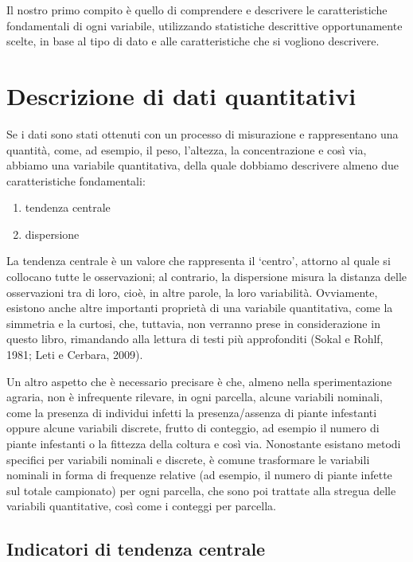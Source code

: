 \documentclass[
  12pt,
]{book}
\providecommand{\tightlist}{%
  \setlength{\itemsep}{0pt}\setlength{\parskip}{0pt}}
\begin{document}
Il nostro primo compito è quello di comprendere e descrivere le caratteristiche fondamentali di ogni variabile, utilizzando statistiche descrittive opportunamente scelte, in base al tipo di dato e alle caratteristiche che si vogliono descrivere.

\hypertarget{descrizione-di-dati-quantitativi}{%
\section{Descrizione di dati quantitativi}\label{descrizione-di-dati-quantitativi}}

Se i dati sono stati ottenuti con un processo di misurazione e rappresentano una quantità, come, ad esempio, il peso, l'altezza, la concentrazione e così via, abbiamo una variabile quantitativa, della quale dobbiamo descrivere almeno due caratteristiche fondamentali:

\begin{enumerate}
\def\labelenumi{\arabic{enumi}.}
\tightlist
\item
  tendenza centrale
\item
  dispersione
\end{enumerate}

La tendenza centrale è un valore che rappresenta il `centro', attorno al quale si collocano tutte le osservazioni; al contrario, la dispersione misura la distanza delle osservazioni tra di loro, cioè, in altre parole, la loro variabilità. Ovviamente, esistono anche altre importanti proprietà di una variabile quantitativa, come la simmetria e la curtosi, che, tuttavia, non verranno prese in considerazione in questo libro, rimandando alla lettura di testi più approfonditi (Sokal e Rohlf, 1981; Leti e Cerbara, 2009).

Un altro aspetto che è necessario precisare è che, almeno nella sperimentazione agraria, non è infrequente rilevare, in ogni parcella, alcune variabili nominali, come la presenza di individui infetti la presenza/assenza di piante infestanti oppure alcune variabili discrete, frutto di conteggio, ad esempio il numero di piante infestanti o la fittezza della coltura e così via. Nonostante esistano metodi specifici per variabili nominali e discrete, è comune trasformare le variabili nominali in forma di frequenze relative (ad esempio, il numero di piante infette sul totale campionato) per ogni parcella, che sono poi trattate alla stregua delle variabili quantitative, così come i conteggi per parcella.

\hypertarget{indicatori-di-tendenza-centrale}{%
\subsection{Indicatori di tendenza centrale}\label{indicatori-di-tendenza-centrale}}
\end{document}
